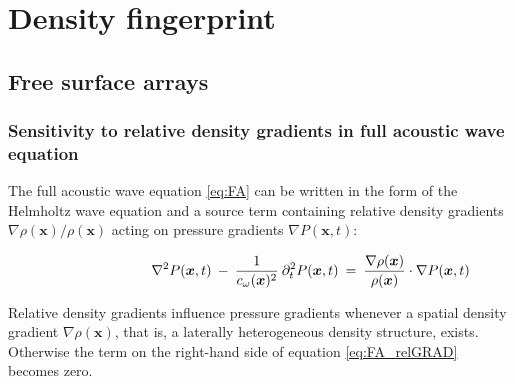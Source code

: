 \documentclass{article}
\begin{document}
	\section{Density fingerprint} \label{sec:fingerprint}
	\subsection{Free surface arrays}
	\subsubsection*{Sensitivity to relative density gradients in full acoustic wave equation}
	
	The full acoustic wave equation \eqref{eq:FA} can be written in the form of the Helmholtz wave equation and a source term containing relative density gradients $\nabla \rho(\bm{x})/\rho(\bm{x})$ acting on pressure gradients $\nabla P(\bm{x},t)$:
	
	\begin{align}\label{eq:FA_relGRAD}
		\shoveright \shoveright \shoveright \shoveright \shoveright \shoveright \shoveright \shoveright %
		\; \nabla^{2} P(\bm{x},t) \: - \: \frac{1}{c_{\omega}(\bm{x})^{2}}  \: \partial_{t}^{2} P(\bm{x},t)  &\: = \: \frac{\nabla \rho(\bm{x})}{\rho(\bm{x})} \cdot \nabla P(\bm{x},t) 
	\end{align}
	
	Relative density gradients influence pressure gradients whenever a spatial density gradient $\nabla \rho(\bm{x})$, that is, a laterally heterogeneous density structure, exists. Otherwise the term on the right-hand side of equation \eqref{eq:FA_relGRAD} becomes zero.  \\
	
\end{document}
